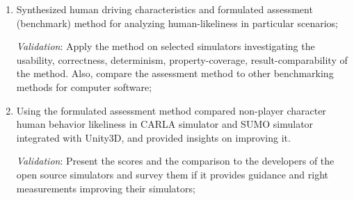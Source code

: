 \documentclass{VUMIFPS-master-intro}
\begin{document}
\begin{enumerate}

	\item Synthesized human driving characteristics and formulated assessment 
	(benchmark) method for analyzing human-likeliness in particular scenarios;
	
	\textit{Validation}: Apply the method on selected simulators investigating 
	the usability, correctness, determinism, property-coverage, 
	result-comparability of the method. Also, compare the assessment method to 
	other benchmarking methods for computer software;
	
    
	\item Using the formulated assessment method compared non-player character 
	human behavior likeliness in CARLA simulator and SUMO simulator integrated 
	with Unity3D, and provided insights on improving it.
	
	\textit{Validation}: Present the scores and the comparison to the 
	developers of the open source simulators and survey them if it provides 
	guidance and right measurements improving their simulators;
	
\end{enumerate}








\newpage
\printbibliography[heading=bibintoc]




\end{document}
